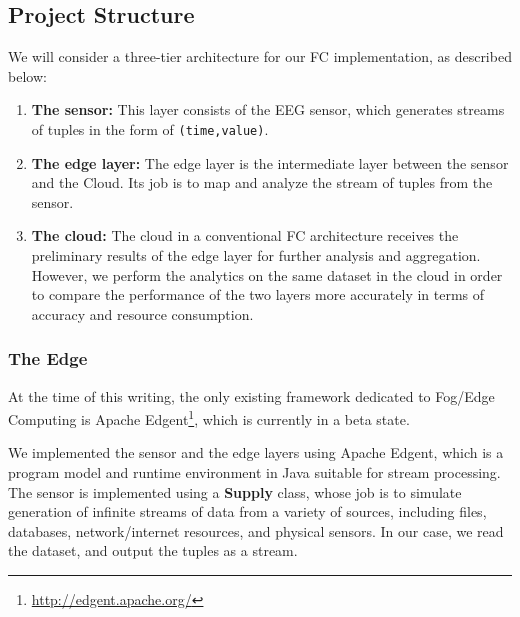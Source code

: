 \documentclass[letterpaper]{article}
\begin{document}
 \subsection{Project Structure}
 We will consider a three-tier architecture for our FC implementation, as described below:

 \begin{enumerate}
     \item \textbf{The sensor:} This layer consists of the EEG sensor, which generates streams of tuples in the form of \texttt{(time,value)}.       

     \item \textbf{The edge layer:} The edge layer is the intermediate layer between the sensor and the Cloud. Its job is to map and analyze the stream of tuples from the sensor.          

     \item \textbf{The cloud:} The cloud in a conventional FC architecture receives the preliminary results of the edge layer for further analysis and aggregation. However, we perform the analytics on the same dataset in the cloud in order to compare the performance of the two layers more accurately in terms of accuracy and resource consumption.
 \end{enumerate}

 \subsubsection{The Edge}
 At the time of this writing, the only existing framework dedicated to Fog/Edge Computing is Apache Edgent\footnote{\url{http://edgent.apache.org/}}, which is currently in a beta state. 
 
 We implemented the sensor and the edge layers using Apache Edgent, which is a program model and runtime environment in Java suitable for stream processing. The sensor is implemented using a \textbf{Supply} class, whose job is to simulate generation of infinite streams of data from a variety of sources, including files, databases, network/internet resources, and physical sensors. In our case, we read the dataset, and output the tuples as a stream.
\end{document}
